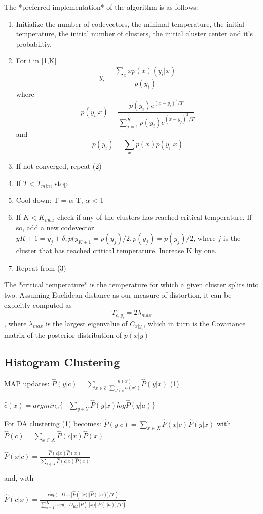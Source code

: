 \documentclass[9pt,parskip]{scrartcl}
\begin{document}
\begin{multicols*}{4}
The *preferred implementation* of the algorithm is as follows:
\begin{enumerate}
    \item Initialize the number of codevectors, the minimal temperature, the initial temperature, the initial number of clusters, the initial cluster center and it's probabiltiy. 
\item For i in [1,K] $$y_i = \frac{\sum_x x p(x)(y_i|x)}{p(y_i)}$$ 
    where $$p(y_i|x) = \frac{p(y_i)e^{(x-y_i)^2/T}}{\sum_{j=1}^Kp(y_i)e^{(x-y_j)^2/T}}$$
    and $$p(y_i) = \sum_xp(x)p(y_i|x)$$
\item If not converged, repeat (2)
\item If $T < T_{min}$, stop
\item Cool down: T = $\alpha$ T, $\alpha$ < 1
\item If $K < K_{max}$ check if any of the clusters has reached critical temperature. If so, add a new codevector $y{K+1} = y_j + \delta, p(y_{K+1} = p(y_j)/2, p(y_j) = p(y_j)/2$, where $j$ is the cluster that has reached critical temperature. Increase K by one. 
\item Repeat from (3)
\end{enumerate}


The *critical temperature* is the temperature for which a given cluster splits into two. Assuming Euclidean distance as our measure of distortion, it can be explcitly computed as $$T_{c,y_i} = 2\lambda_{max}$$, where $\lambda_{max}$ is the largest eigenvalue of $C_{x|y_i}$, which in turn is the Covariance matrix of the posterior distribution of $p(x|y)$
\subsection*{Histogram Clustering}
MAP updates:
$\hat{P}(y|c) = \sum_{x \in \hat{c}}{\frac{n(x)}{\sum_{x' \in c}n(x')}\hat{P}(y|x)} $  (1)

$\hat{c}(x) = argmin_{a}\{-\sum_{y\in Y}{\hat{P}(y|x)log\hat{P}(y|a)}\}$  

For DA clustering (1) becomes:
$\hat{P}(y|c)=\sum_{x \in X}\hat{P}(x|c) \hat{P}(y|x)$
with
$\hat{P}(c) = \sum_{x \in X}\hat{P}(c|x)\hat{P}(x)$

$\hat{P}(x|c) = \frac{\hat{P}(c|x)\hat{P}(x)}{\sum_{x \in X}\hat{P}(c|x)\hat{P}(x)}$

and, with

$\hat{P}(c|x) = \frac{exp(-D_{KL}[\hat{P}(.|x)||\hat{P}(.|a)]/T)}{\sum_{b=1}^{K}exp(-D_{KL}[\hat{P}(.|x)||\hat{P}(.|a)]/T)}$ 


\end{multicols*}
\end{document}
